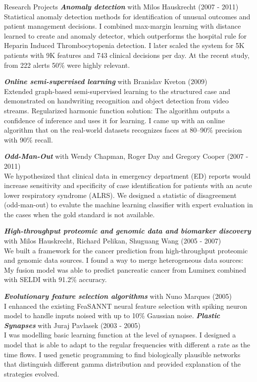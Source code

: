 \documentclass{resume}
\begin{document}
\begin{category}{Research Projects}
\citembullet \emph{\bf Anomaly detection} with Milos Hauskrecht (2007 - 2011)\\
Statistical anomaly detection methods for identification of unusual outcomes and
patient management decisions.
I combined max-margin learning with distance learned to create and anomaly
detector, which outperforms the hospital rule for Heparin Induced
Thrombocytopenia detection.
I later scaled the system for 5K patients with 9K features and 743 clinical
decisions per day.
At the recent study, from 222 alerts 50\%  were highly relevant.

\citembullet \emph{\bf Online semi-supervised learning} with Branislav Kveton
(2009)\\
Extended graph-based semi-supervised learning to the structured case and
demonstrated on handwriting recognition and object detection from video streams.
Regularized harmonic function solution: The algorithm outputs a confidence of
inference and uses it for learning. I came up with an online algorithm that on
the real-world datasets recognizes faces at 80--90\% precision with 90\% recall.

\citembullet
\emph{\bf  Odd-Man-Out} with Wendy Chapman, Roger Day and Gregory Cooper (2007 -
2011)\\
We hypothesized that clinical data in emergency department (ED) reports would
increase sensitivity and specificity of case identification for patients with an
acute lower respiratory syndrome (ALRS). We designed a statistic of disagreement
(odd-man-out) to evalute the machine learning classifier with expert evaluation
in the cases when the gold standard is not available.

\citembullet
\emph{\bf High-throughput proteomic and genomic data and biomarker discovery} with Milos Hauskrecht, Richard Pelikan,   Shuguang Wang
   (2005 - 2007) \\
We built a framework for the cancer prediction from high-throughput proteomic and
genomic data sources.
I found a way to merge heterogeneous data sources: My fusion model was able to
predict
pancreatic cancer from Luminex combined with SELDI with 91.2\% accuracy.

\citembullet
\emph{\bf  Evolutionary feature selection algorithms} with Nuno Marques (2005)\\
I enhanced the existing FeaSANNT neural feature selection with spiking neuron
model to handle inputs noised with up to 10\% Gaussian noise.
\citembullet
\emph{\bf Plastic Synapses} with Juraj Pavlasek (2003 - 2005)\\
I was modelling basic learning function at the level of synapses.  I designed a
model that is able to adapt to the regular frequencies with different a rate as
the time flows. I used genetic programming to find biologically plausible
networks that distinguish different gamma distribution and provided explanation
of the strategies evolved.
\end{category}
\end{document}
